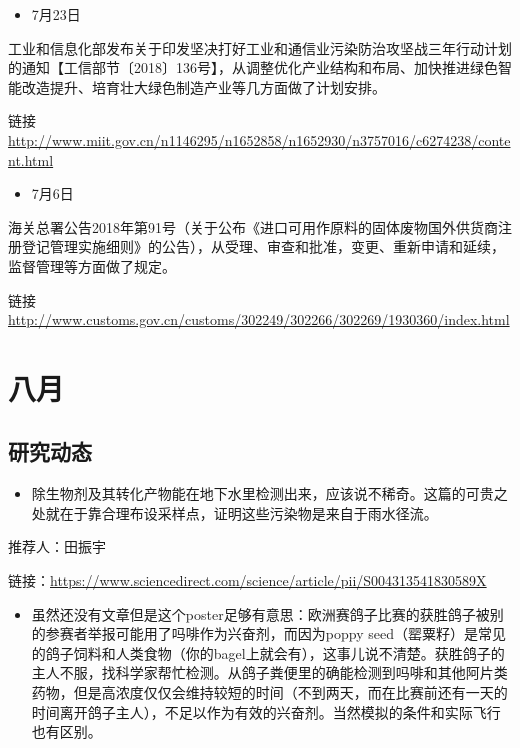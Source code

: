 \documentclass[]{book}
\providecommand{\tightlist}{%
  \setlength{\itemsep}{0pt}\setlength{\parskip}{0pt}}
\begin{document}
\begin{itemize}
\tightlist
\item
  7月23日
\end{itemize}

工业和信息化部发布关于印发坚决打好工业和通信业污染防治攻坚战三年行动计划的通知【工信部节〔2018〕136号】，从调整优化产业结构和布局、加快推进绿色智能改造提升、培育壮大绿色制造产业等几方面做了计划安排。

链接 \url{http://www.miit.gov.cn/n1146295/n1652858/n1652930/n3757016/c6274238/content.html}

\begin{itemize}
\tightlist
\item
  7月6日
\end{itemize}

海关总署公告2018年第91号（关于公布《进口可用作原料的固体废物国外供货商注册登记管理实施细则》的公告），从受理、审查和批准，变更、重新申请和延续，监督管理等方面做了规定。

链接 \url{http://www.customs.gov.cn/customs/302249/302266/302269/1930360/index.html}

\hypertarget{ux516bux6708}{%
\section*{八月}\label{ux516bux6708}}

\hypertarget{ux7814ux7a76ux52a8ux6001-9}{%
\subsection*{研究动态}\label{ux7814ux7a76ux52a8ux6001-9}}

\begin{itemize}
\tightlist
\item
  除生物剂及其转化产物能在地下水里检测出来，应该说不稀奇。这篇的可贵之处就在于靠合理布设采样点，证明这些污染物是来自于雨水径流。
\end{itemize}

推荐人：田振宇

链接：\url{https://www.sciencedirect.com/science/article/pii/S004313541830589X}

\begin{itemize}
\tightlist
\item
  虽然还没有文章但是这个poster足够有意思：欧洲赛鸽子比赛的获胜鸽子被别的参赛者举报可能用了吗啡作为兴奋剂，而因为poppy seed（罂粟籽）是常见的鸽子饲料和人类食物（你的bagel上就会有），这事儿说不清楚。获胜鸽子的主人不服，找科学家帮忙检测。从鸽子粪便里的确能检测到吗啡和其他阿片类药物，但是高浓度仅仅会维持较短的时间（不到两天，而在比赛前还有一天的时间离开鸽子主人），不足以作为有效的兴奋剂。当然模拟的条件和实际飞行也有区别。
\end{itemize}
\end{document}
